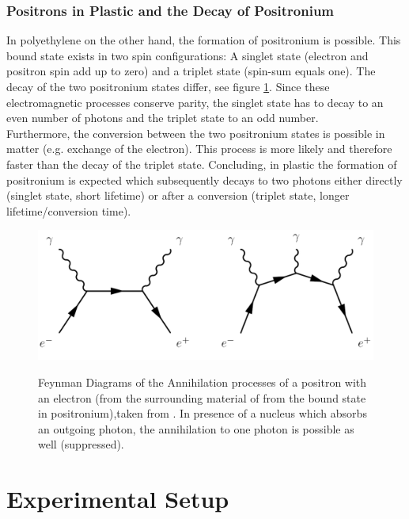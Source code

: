 \documentclass[
	paper=A4,
	parskip=full,
	chapterprefix=true,
	11pt,
	headings=normal,
	bibliography=totoc,
	listof=totoc,
	titlepage=on,
]{scrreprt}
\begin{document}
\subsection{Positrons in Plastic and the Decay of Positronium}

In polyethylene on the other hand, the formation of positronium is possible. This bound state exists in two spin configurations: A singlet state (electron and positron spin add up to zero) and a triplet state (spin-sum equals one). The decay of the two positronium states differ, see figure \ref{fig:feynman_positronium}. Since these electromagnetic processes conserve parity, the singlet state has to decay to an even number of photons and the triplet state to an odd number\cite{Lab_manual_T8}. \\
Furthermore, the conversion between the two positronium states is possible in matter (e.g. exchange of the electron). This process is more likely and therefore faster than the decay of the triplet state. Concluding, in plastic the formation of positronium is expected which subsequently decays to two photons either directly (singlet state, short lifetime)  or after a conversion (triplet state, longer lifetime/conversion time).

\begin{figure}
	\centering
	\includegraphics{feynman_positroniumdecay} \\
	\caption{Feynman Diagrams of the Annihilation processes of a positron with an electron (from the surrounding material of from the bound state in positronium),taken from \cite{Lab_manual_T8}. In presence of a nucleus which absorbs an outgoing photon, the annihilation to one photon is possible as well (suppressed).}
	\label{fig:feynman_positronium}
\end{figure}


\chapter{Experimental Setup}
\end{document}
